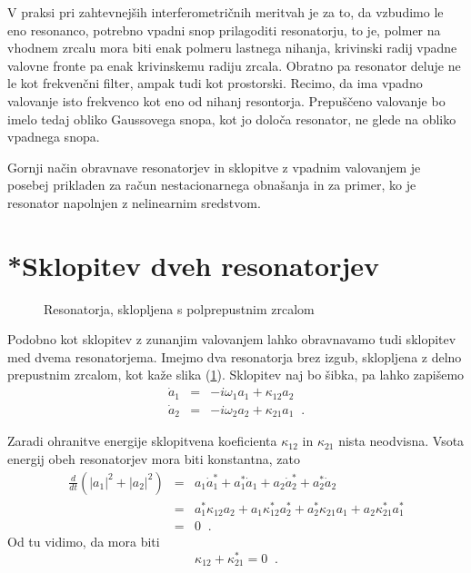 V praksi pri zahtevnejših interferometričnih meritvah je za to, da
vzbudimo le eno resonanco, potrebno vpadni snop prilagoditi resonatorju,
to je, polmer na vhodnem zrcalu mora biti enak polmeru lastnega nihanja,
krivinski radij vpadne valovne fronte pa enak krivinskemu radiju zrcala.
Obratno pa resonator deluje ne le kot frekvenčni filter, ampak tudi
kot prostorski. Recimo, da ima vpadno valovanje isto frekvenco kot
eno od nihanj resontorja. Prepuščeno valovanje bo imelo tedaj obliko
Gaussovega snopa, kot jo določa resonator, ne glede na obliko vpadnega
snopa.

Gornji način obravnave resonatorjev in sklopitve z vpadnim valovanjem
je posebej prikladen za račun nestacionarnega obnašanja in za primer,
ko je resonator napolnjen z nelinearnim sredstvom.


\section{*Sklopitev dveh resonatorjev}

\begin{figure}
 \caption{Resonatorja, sklopljena s polprepustnim zrcalom}


\label{sl3.5}\vskip7cm 
\end{figure}


Podobno kot sklopitev z zunanjim valovanjem lahko obravnavamo tudi
sklopitev med dvema resonatorjema. Imejmo dva resonatorja brez izgub,
sklopljena z delno prepustnim zrcalom, kot kaže slika (\ref{sl3.5}).
Sklopitev naj bo šibka, pa lahko zapišemo 
\begin{eqnarray}
\dot{a}_{1} & = & -i\omega_{1}a_{1}+\kappa_{12}a_{2}\nonumber \\
\dot{a}_{2} & = & -i\omega_{2}a_{2}+\kappa_{21}a_{1}\;\;.
\end{eqnarray}

Zaradi ohranitve energije sklopitvena koeficienta $\kappa_{12}$ in
$\kappa_{21}$ nista neodvisna. Vsota energij obeh resonatorjev mora
biti konstantna, zato 
\begin{eqnarray}
\frac{d}{dt}(|a_{1}|^{2}+|a_{2}|^{2}) & = & a_{1}\dot{a}_{1}^{*}+a_{1}^{*}\dot{a}_{1}+
a_{2}\dot{a}_{2}^{*}+a_{2}^{*}\dot{a}_{2}\nonumber \\
 & = & a_{1}^{*}\kappa_{12}a_{2}+a_{1}\kappa_{12}^{*}a_{2}^{*}+a_{2}^{*}\kappa_{21}a_{1}+
 a_{2}\kappa_{21}^{*}a_{1}^{*}\nonumber \\
 & = & 0\;\;.
\end{eqnarray}
 Od tu vidimo, da mora biti 
\begin{equation}
\kappa_{12}+\kappa_{21}^{*}=0\;\;.\label{3.56}
\end{equation}

